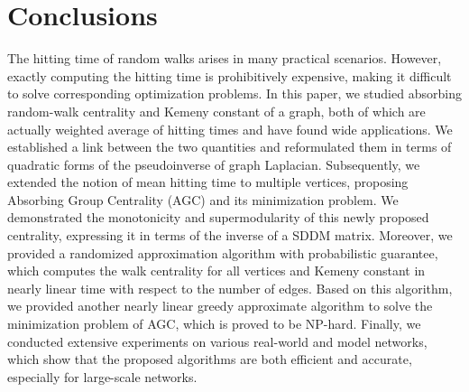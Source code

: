 \documentclass[journal]{IEEEtran}
\begin{document}
\section{Conclusions}

The hitting time of random walks arises in many practical scenarios.
However, exactly computing the hitting time is prohibitively expensive, making it difficult to solve corresponding optimization problems.
In this paper, we studied absorbing random-walk centrality and Kemeny constant of a graph, both of which are actually weighted average of hitting times and have found wide applications.
We established a link between the two quantities and reformulated them in terms of quadratic forms of the pseudoinverse of graph Laplacian.
Subsequently, we extended the notion of mean hitting time to multiple vertices, proposing Absorbing Group Centrality (AGC) and its minimization problem.
We demonstrated the monotonicity and supermodularity of this newly proposed centrality, expressing it in terms of the inverse of a SDDM matrix.
Moreover, we provided a randomized approximation algorithm with probabilistic guarantee, which computes the walk centrality for all vertices and Kemeny constant in nearly linear time with respect to the number of edges.
Based on this algorithm, we provided another nearly linear greedy approximate algorithm to solve the minimization problem of AGC, which is proved to be NP-hard.
Finally, we conducted extensive experiments on various real-world and model networks, which show that the proposed algorithms are both efficient and accurate, especially for large-scale networks.


\balance

\end{document}
